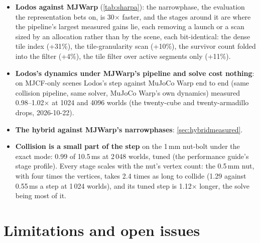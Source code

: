 \begin{itemize}
\item \textbf{Lodos against MJWarp} (\cref{tab:sharpa}): the narrowphase, the evaluation the representation bets on, is 30$\times$ faster, and the stages around it are where the pipeline's largest measured gains lie, each removing a launch or a scan sized by an allocation rather than by the scene, each bit-identical: the dense tile index (+31\%), the tile-granularity scan (+10\%), the survivor count folded into the filter (+4\%), the tile filter over active segments only (+11\%).
\item \textbf{Lodos's dynamics under MJWarp's pipeline and solve cost nothing}: on MJCF-only scenes Lodos's step against MuJoCo Warp end to end (same collision pipeline, same solver, MuJoCo Warp's own dynamics) measured 0.98--1.02$\times$ at 1024 and 4096 worlds (the twenty-cube and twenty-armadillo drops, 2026-10-22).
\item \textbf{The hybrid against MJWarp's narrowphases}: \cref{sec:hybridmeasured}.
\item \textbf{Collision is a small part of the step} on the 1\,mm nut-bolt under the exact mode: 0.99 of 10.5\,ms at 2\,048 worlds, tuned (the performance guide's stage profile). Every stage scales with the nut's vertex count: the 0.5\,mm nut, with four times the vertices, takes 2.4 times as long to collide (1.29 against 0.55\,ms a step at 1\,024 worlds), and its tuned step is 1.12$\times$ longer, the solve being most of it.
\end{itemize}

\section{Limitations and open issues}\label{sec:limits}

